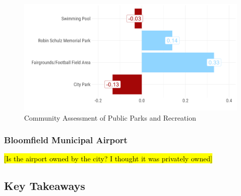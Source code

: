\begin{figure}[H]
\centering
\begin{framed}
    \caption{Community Assessment of Public Parks and Recreation}
    \label{fig:scoreParks}
    \includegraphics[width = \linewidth]{figures/score_parks.png}
\end{framed}
\end{figure}

\pagebreak
\subsubsection*{Bloomfield Municipal Airport}

\noindent \hl{[Is the airport owned by the city? I thought it was privately owned]}

\pagebreak
\subsection*{Key Takeaways}